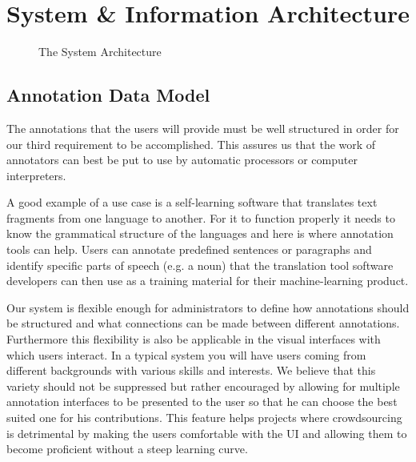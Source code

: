 \section{\KAT System \& Information Architecture}\label{sec:sysarch}

\begin{figure}[ht]\centering
{}
\caption{The \KAT System Architecture}\label{fig:kat-arch}
\end{figure}

\subsection{\KAT Annotation Data Model}
The annotations that the users will provide must be well structured in order for our third
requirement to be accomplished. This assures us that the work of annotators can best be
put to use by automatic processors or computer interpreters.

A good example of a use case is a self-learning software that translates text fragments
from one language to another.  For it to function properly it needs to know the
grammatical structure of the languages and here is where annotation tools can help.  Users
can annotate predefined sentences or paragraphs and identify specific parts of speech
(e.g. a noun) that the translation tool software developers can then use as a training
material for their machine-learning product.

Our system is flexible enough for administrators to
define how annotations should be structured and what connections can be made between
different annotations.  Furthermore this flexibility is also be applicable in the
visual interfaces with which users interact. In a typical system you will have users
coming from different backgrounds with various skills and interests. We believe that this
variety should not be suppressed but rather encouraged by allowing for multiple annotation
interfaces to be presented to the user so that he can choose the best suited one for his
contributions. This feature helps projects where crowdsourcing is detrimental by making
the users comfortable with the UI and allowing them to become proficient without a steep
learning curve.

